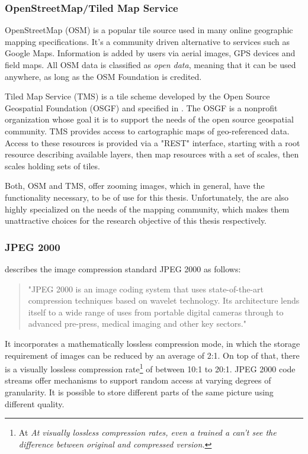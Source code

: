 \subsubsection{OpenStreetMap/Tiled Map Service}
OpenStreetMap (OSM) is a popular tile source used in many online geographic mapping specifications\cite{web:openseadragon}. It's a community driven alternative to services such as Google Maps. Information is added by users via aerial images, GPS devices and field maps. All OSM data is classified as \emph{open data}, meaning that it can be used anywhere, as long as the OSM Foundation is credited\cite{web:osm}.

Tiled Map Service (TMS) is a tile scheme developed by the Open Source Geospatial Foundation (OSGF)\cite{web:openseadragon} and specified in \cite{web:tms}. The OSGF is a nonprofit organization whose goal it is to support the needs of the open source geospatial community. TMS provides access to cartographic maps of geo-referenced data. Access to these resources is provided via a "REST" interface, starting with a root resource describing available layers, then map resources with a set of scales, then scales holding sets of tiles\cite{web:tms}.

Both, OSM and TMS, offer zooming images, which in general, have the functionality necessary, to be of use for this thesis. Unfortunately, the are also highly specialized on the needs of the mapping community, which makes them unattractive choices for the research objective of this thesis respectively.


\subsubsection{JPEG 2000}
\cite{web:jpeg2000} describes the image compression standard JPEG 2000 as follows:
\begin{quotation}
	"JPEG 2000 is an image coding system that uses state-of-the-art compression techniques based on wavelet technology. Its architecture lends itself to a wide range of uses from portable digital cameras through to advanced pre-press, medical imaging and other key sectors."
\end{quotation}

It incorporates a mathematically lossless compression mode, in which the storage requirement of images can be reduced by an average of 2:1. On top of that, there is a visually lossless compression rate\footnote{At \emph{At visually lossless compression rates, even a trained a can't see the difference between original and compressed version\cite{intoPix08}.}} of between 10:1 to 20:1\cite{intoPix08}. JPEG 2000 code streams offer mechanisms to support random access at varying degrees of granularity. It is possible to store different parts of the same picture using different quality\cite{Taubmann01}. 

